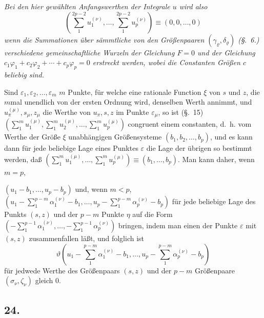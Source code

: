 \documentclass{article}
\begin{document}
\emph{Bei den hier gewählten Anfangswerthen der Integrale $u$ wird also}
\[ \left(\sum_{1}^{2p-2} u_{1}^{(\nu)}, \ldots, \sum_{1}^{2p-2} u_{p}^{(\nu)}\right) \equiv (0, 0, \ldots, 0) \]
\emph{wenn die Summationen über sämmtliche von den Größenpaaren $(\gamma_{\varrho}, \delta_{\varrho})$ (§.~6.) verschiedene gemeinschaftliche Wurzeln der Gleichung $F = 0$ und der Gleichung $c_{1}\varphi_{1} + c_{2}\varphi_{2} + \cdots + c_{p}\varphi_{p} = 0$ erstreckt werden, wobei die Constanten Größen $c$ beliebig sind.}

Sind $\varepsilon_{1}, \varepsilon_{2}, \ldots, \varepsilon_{m}$ $m$ Punkte, für welche eine rationale Function $\xi$ von $s$ und $z$, die $m$mal unendlich von der ersten Ordnung wird, denselben Werth annimmt, und $u_{\pi}^{(\mu)}, s_{\mu}, z_{\mu}$ die Werthe von $u_{\pi}, s, z$ im Punkte $\varepsilon_{\mu}$, so ist (§.~15) $\left(\displaystyle\sum_{1}^{m} u_{1}^{(\mu)}, \sum_{1}^{m} u_{2}^{(\mu)}, \ldots, \sum_{1}^{m} u_{p}^{(\mu)}\right)$ congruent einem constanten, d.~h. vom Werthe der Größe $\xi$ unabhängigen Größensysteme $(b_{1}, b_{2}, \ldots, b_{p})$, und es kann dann für jede beliebige Lage eines Punktes $\varepsilon$ die Lage der übrigen so bestimmt werden, daß $\left(\displaystyle\sum_{1}^{m} u_{1}^{(\mu)}, \ldots, \sum_{1}^{m} u_{p}^{(\mu)}\right) \equiv (b_{1}, \ldots, b_{p})$. Man kann daher, wenn $m = p$,

$(u_{1}-b_{1}, \ldots, u_{p}-b_{p})$ und, wenn $m < p$, $\left(u_{1} - \displaystyle\sum_{1}^{p-m} \alpha_{1}^{(\nu)} - b_{1}, \ldots, u_{p} - \sum_{1}^{p-m} \alpha_{p}^{(\nu)} - b_{p}\right)$ für jede beliebige Lage des Punkts $(s, z)$ und der $p-m$ Punkte $\eta$ auf die Form $\left(-\displaystyle\sum_{1}^{p-1} \alpha_{1}^{(\nu)}, \ldots, -\sum_{1}^{p-1} \alpha_{p}^{(\nu)}\right)$ bringen, indem man einen der Punkte $\varepsilon$ mit $(s, z)$ zusammenfallen läßt, und folglich ist
\[ \vartheta\left(u_{1} - \sum_{1}^{p-m} \alpha_{1}^{(\nu)} - b_{1}, \ldots, u_{p} - \sum_{1}^{p-m} \alpha_{p}^{(\nu)} - b_{p}\right) \]
für jedwede Werthe des Größenpaars $(s, z)$ und der $p-m$ Größenpaare $(\sigma_{\nu}, \zeta_{\nu})$ gleich 0.

\subsection*{24.}
\end{document}
